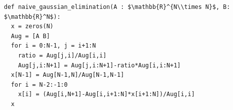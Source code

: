 \documentclass[border=10pt]{standalone}
\begin{document}
\begin{lstlisting}
def naive_gaussian_elimination(A : $\mathbb{R}^{N\\times N}$, B: $\mathbb{R}^N$):
  x = zeros(N)
  Aug = [A B]
  for i = 0:N-1, j = i+1:N
    ratio = Aug[j,i]/Aug[i,i]
    Aug[j,i:N+1] = Aug[j,i:N+1]-ratio*Aug[i,i:N+1]
  x[N-1] = Aug[N-1,N]/Aug[N-1,N-1]
  for i = N-2:-1:0
    x[i] = (Aug[i,N+1]-Aug[i,i+1:N]*x[i+1:N])/Aug[i,i]
  x
\end{lstlisting}
\end{document}
